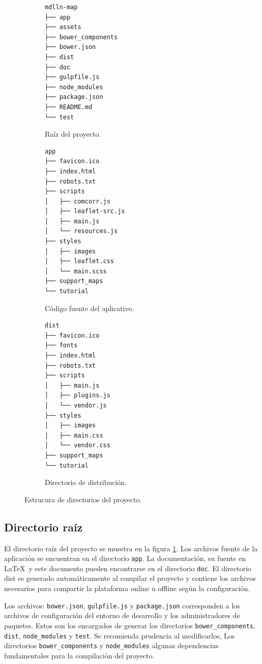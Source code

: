 \documentclass[11pt,letterpaper]{article}
\begin{document}
\begin{figure}[ht!]
\centering
\begin{subfigure}{.29\textwidth}
\begin{BVerbatim}
mdlln-map
├── app
├── assets
├── bower_components
├── bower.json
├── dist
├── doc
├── gulpfile.js
├── node_modules
├── package.json
├── README.md
└── test
\end{BVerbatim}
\caption{Raíz del proyecto.}\label{fig:root}
\end{subfigure}
\hfill
\begin{subfigure}{.29\textwidth}
\begin{BVerbatim}
app
├── favicon.ico
├── index.html
├── robots.txt
├── scripts
│   ├── comcorr.js
│   ├── leaflet-src.js
│   ├── main.js
│   └── resources.js
├── styles
│   ├── images
│   ├── leaflet.css
│   └── main.scss
├── support_maps
└── tutorial
\end{BVerbatim}
\caption{Código fuente del aplicativo.}\label{fig:app}
\end{subfigure}
\hfill
\begin{subfigure}{.29\textwidth}
\begin{BVerbatim}
dist
├── favicon.ico
├── fonts
├── index.html
├── robots.txt
├── scripts
│   ├── main.js
│   ├── plugins.js
│   └── vendor.js
├── styles
│   ├── images
│   ├── main.css
│   └── vendor.css
├── support_maps
└── tutorial
\end{BVerbatim}
\caption{Directorio de distribución.}\label{fig:dist}
\end{subfigure}
\caption{Estrucura de directorios del proyecto.}
\end{figure}

\subsection{Directorio raíz}
El directorio raíz del proyecto se muestra en la figura \ref{fig:root}. Los archivos fuente de la aplicación se encuentran en el directorio {\tt app}. La documentación, su fuente en \LaTeX\ y este documento pueden encontrarse en el directorio {\tt doc}. El directorio dist es generado automáticamente al compilar el proyecto y contiene los archivos necesarios para compartir la plataforma online u offline según la configuración. 

Los archivos: {\tt bower.json}, {\tt gulpfile.js} y {\tt package.json} corresponden a los archivos de configuración del entorno de desarrollo y los administradores de paquetes. Estos son los encargados de generar los directorios {\tt bower\_components}, {\tt dist}, {\tt node\_modules} y {\tt test}. Se recomienda prudencia al modificarlos, Los directorios {\tt bower\_components} y {\tt node\_modules} algunas dependencias fundamentales para la compilación del proyecto.
\end{document}
